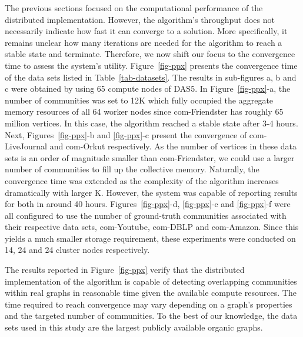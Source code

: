 The previous sections focused on the computational performance of the
distributed implementation. However, the algorithm's throughput does not
necessarily indicate how fast it can converge to a solution. More specifically, it
remains unclear how many iterations are needed for the algorithm to reach a
stable state and terminate. Therefore, we now shift our focus to the
convergence time to assess the system's utility. Figure~\ref{fig-ppx} presents
the convergence time of the data sets listed in Table~\ref{tab-datasets}.
%
The results in sub-figures a, b and c were obtained by using 65 compute nodes
of DAS5. In Figure~\ref{fig-ppx}-a, the number of communities was set to 12K
which fully occupied the aggregate memory resources of all 64 worker nodes since
com-Friendster has roughly 65 million vertices. In this case, the algorithm
reached a stable state after 3-4 hours. Next, Figures~\ref{fig-ppx}-b and
\ref{fig-ppx}-c present the convergence of com-LiveJournal and com-Orkut
respectively. As the number of vertices in these data sets is an order of
magnitude smaller than com-Friendster, we could use a larger number of
communities to fill up the collective memory. Naturally, the convergence time was extended as the complexity of
the algorithm increases dramatically with larger K. However, the system was
capable of reporting results for both in around 40 hours.
%
Figures~\ref{fig-ppx}-d, \ref{fig-ppx}-e and \ref{fig-ppx}-f were all
configured to use the number of ground-truth communities associated with
their respective data sets, com-Youtube, com-DBLP and com-Amazon. Since this
yields a much smaller storage requirement,
these experiments were conducted on 14, 24 and 24 cluster nodes respectively.

The results reported in Figure~\ref{fig-ppx} verify that the distributed
implementation of the algorithm is capable of detecting overlapping communities
within real graphs in reasonable time given the available compute resources.
The time required to reach convergence may vary depending on a graph's properties and
the targeted number of communities. To the best of our knowledge, the data sets
used in this study are the largest publicly available organic graphs.

